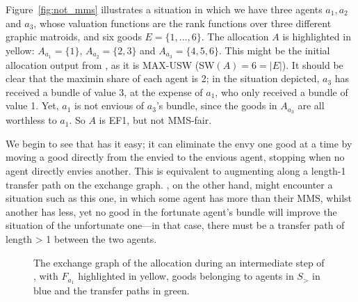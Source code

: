 Figure~\ref{fig:not_mms} illustrates a situation in which we have three agents $a_1, a_2$ and $a_3$, whose valuation functions are the rank functions over three different graphic matroids, and six goods $E=\{1,\dots,6\}$. The allocation $A$ is highlighted in yellow: $A_{a_1} = \{1\}$, $A_{a_2} = \{2,3\}$ and $A_{a_3} = \{4,5,6\}$. This might be the initial allocation output from , as it is MAX-USW (SW$(A) = 6 = |E|$). It should be clear that the maximin share of each agent is 2; in the situation depicted, $a_3$ has received a bundle of value 3, at the expense of $a_1$, who only received a bundle of value 1. Yet, $a_1$ is not envious of $a_3$'s bundle, since the goods in $A_{a_3}$ are all worthless to $a_1$. So $A$ is EF1, but not MMS-fair. 

We begin to see that  has it easy; it can eliminate the envy one good at a time by moving a good directly from the envied to the envious agent, stopping when no agent directly envies another. This is equivalent to augmenting along a length-1 transfer path on the exchange graph. , on the other hand, might encounter a situation such as this one, in which some agent has more than their MMS, whilst another has less, yet no good in the fortunate agent's bundle will improve the situation of the unfortunate one---in that case, there must be a transfer path of length > 1 between the two agents.

\begin{figure}[ht!]
\centering
{}
\caption{The exchange graph of the allocation during an intermediate step of , with $F_{a_1}$ highlighted in yellow, goods belonging to agents in $S_>$ in blue and the transfer paths in green.}
\label{fig:exchange-graph}
\end{figure}

